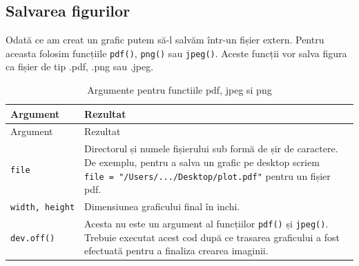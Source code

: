 \documentclass[]{article}
\begin{document}
\hypertarget{salvarea-figurilor}{%
\subsection{Salvarea figurilor}\label{salvarea-figurilor}}

Odată ce am creat un grafic putem să-l salvăm într-un fișier extern.
Pentru aceasta folosim funcțiile \texttt{pdf()}, \texttt{png()} sau
\texttt{jpeg()}. Aceste funcții vor salva figura ca fișier de tip .pdf,
.png sau .jpeg.

\begin{longtable}[]{@{}ll@{}}
\caption{Argumente pentru functiile pdf, jpeg si png}\tabularnewline
\toprule
\begin{minipage}[b]{0.15\columnwidth}\raggedright
Argument\strut
\end{minipage} & \begin{minipage}[b]{0.79\columnwidth}\raggedright
Rezultat\strut
\end{minipage}\tabularnewline
\midrule
\endfirsthead
\toprule
\begin{minipage}[b]{0.15\columnwidth}\raggedright
Argument\strut
\end{minipage} & \begin{minipage}[b]{0.79\columnwidth}\raggedright
Rezultat\strut
\end{minipage}\tabularnewline
\midrule
\endhead
\begin{minipage}[t]{0.15\columnwidth}\raggedright
\texttt{file}\strut
\end{minipage} & \begin{minipage}[t]{0.79\columnwidth}\raggedright
Directorul și numele fișierului sub formă de șir de caractere. De
exemplu, pentru a salva un grafic pe desktop scriem
\texttt{file\ =\ "/Users/.../Desktop/plot.pdf"} pentru un fișier
pdf.\strut
\end{minipage}\tabularnewline
\begin{minipage}[t]{0.15\columnwidth}\raggedright
\texttt{width,\ height}\strut
\end{minipage} & \begin{minipage}[t]{0.79\columnwidth}\raggedright
Dimensiunea graficului final în inchi.\strut
\end{minipage}\tabularnewline
\begin{minipage}[t]{0.15\columnwidth}\raggedright
\texttt{dev.off()}\strut
\end{minipage} & \begin{minipage}[t]{0.79\columnwidth}\raggedright
Acesta nu este un argument al funcțiilor \texttt{pdf()} și
\texttt{jpeg()}. Trebuie executat acest cod după ce trasarea graficului
a fost efectuată pentru a finaliza crearea imaginii.\strut
\end{minipage}\tabularnewline
\bottomrule
\end{longtable}
\end{document}
